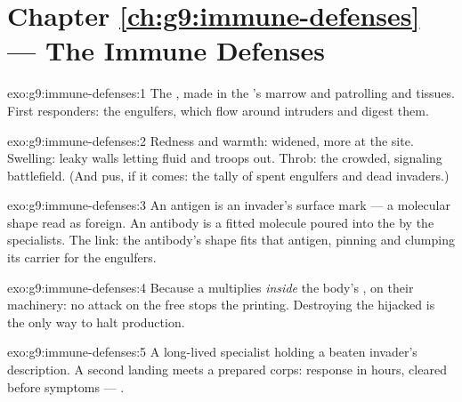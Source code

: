 \section*{Chapter \ref{ch:g9:immune-defenses} --- The Immune Defenses}

\begin{solution}{exo:g9:immune-defenses:1}
The , made in the 's marrow and
patrolling  and tissues. First responders: the
engulfers, which flow around intruders and digest them.
\end{solution}

\begin{solution}{exo:g9:immune-defenses:2}
Redness and warmth:  widened, more  at the
site. Swelling: leaky walls letting fluid and troops out.
Throb: the crowded, signaling battlefield. (And pus, if it
comes: the tally of spent engulfers and dead invaders.)
\end{solution}

\begin{solution}{exo:g9:immune-defenses:3}
An antigen is an invader's surface mark --- a molecular
shape read as foreign. An antibody is a fitted molecule
poured into the  by the specialists. The link: the
antibody's shape fits that antigen, pinning and clumping
its carrier for the engulfers.
\end{solution}

\begin{solution}{exo:g9:immune-defenses:4}
Because a  multiplies \emph{inside} the body's ,
on their machinery: no attack on the free  stops the
printing. Destroying the hijacked  is the
only way to halt production.
\end{solution}

\begin{solution}{exo:g9:immune-defenses:5}
A long-lived specialist holding a beaten invader's
description. A second landing meets a prepared corps:
response in hours, cleared before symptoms --- .
\end{solution}

